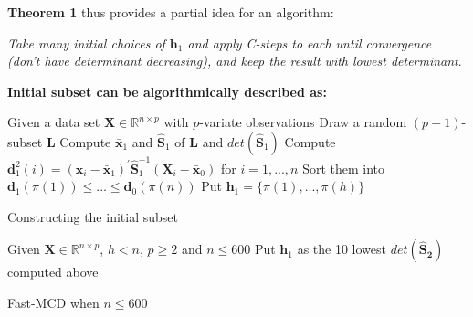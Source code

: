 \documentclass[review]{elsarticle}
\begin{document}
\textbf{Theorem 1} thus provides a partial idea for an algorithm: 

\textit{Take many initial choices of $\boldsymbol{h}_1$ and apply C-steps to each until convergence (don't have determinant decreasing), and keep the result with lowest determinant}.

\textbf{Initial subset can be algorithmically described as:}
\begin{algorithm}
	\label{alg:alg02}
	\scriptsize
	\SetAlgoLined
	Given a data set $\boldsymbol{X} \in \mathbb{R}^{n \times p}$ with $p$-variate observations\;
	Draw a random $(p + 1)$-subset $\boldsymbol{L}$\;
	Compute $\boldsymbol{\bar{x}}_1$ and $\boldsymbol{\hat{S}}_1$ of $\boldsymbol{L}$ and $det(\boldsymbol{\hat{S}}_1)$\;
	Compute $\boldsymbol{d}_1^2(i) = (\boldsymbol{x}_i - \boldsymbol{\bar{x}}_1)^\prime \boldsymbol{\hat{S}}_1^{-1}(\boldsymbol{X}_i - \boldsymbol{\bar{x}}_0)$ for $i = 1, ..., n$\;
	Sort them into $\boldsymbol{d}_1(\pi(1)) \leq ... \leq \boldsymbol{d}_0(\pi(n))$\;
	Put $\boldsymbol{h}_1 = \{\pi(1), ..., \pi(h)\}$\;
	\caption{Constructing the initial subset}
\end{algorithm}

\begin{algorithm}
	\label{alg:alg03}
	\scriptsize
	\SetAlgoLined
	Given $\boldsymbol{X} \in \mathbb{R}^{n \times p}$, $h < n$, $p \geq 2$ and $n \leq 600$\;
	Put $\boldsymbol{h}_1$ as the 10 lowest $det(\boldsymbol{\hat{S}_2})$ computed above\;
	\caption{Fast-MCD when $n \leq 600$}
\end{algorithm}
\end{document}
